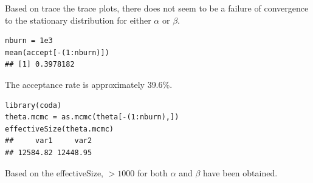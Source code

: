 \documentclass{article}\usepackage[]{graphicx}\usepackage[]{color}
\makeatletter
\newenvironment{kframe}{%
 \def\at@end@of@kframe{}%
 \ifinner\ifhmode%
  \def\at@end@of@kframe{\end{minipage}}%
  \begin{minipage}{\columnwidth}%
 \fi\fi%
 \def\FrameCommand##1{\hskip\@totalleftmargin \hskip-\fboxsep
 \colorbox{shadecolor}{##1}\hskip-\fboxsep
     \hskip-\linewidth \hskip-\@totalleftmargin \hskip\columnwidth}%
 \MakeFramed {\advance\hsize-\width
   \@totalleftmargin\z@ \linewidth\hsize
   \@setminipage}}%
 {\par\unskip\endMakeFramed%
 \at@end@of@kframe}
\newenvironment{knitrout}{}{} %
\makeatother
\begin{document}
Based on trace the trace plots, there does not seem to be a failure of convergence to the stationary distribution for either $\alpha$ or $\beta$.
\begin{knitrout}
\color{fgcolor}\begin{kframe}
\begin{verbatim}
nburn = 1e3
mean(accept[-(1:nburn)])
## [1] 0.3978182
\end{verbatim}
\end{kframe}
\end{knitrout}
The acceptance rate is approximately 39.6\%.
\begin{knitrout}
\color{fgcolor}\begin{kframe}
\begin{verbatim}
library(coda)
theta.mcmc = as.mcmc(theta[-(1:nburn),])
effectiveSize(theta.mcmc)
##     var1     var2 
## 12584.82 12448.95
\end{verbatim}
\end{kframe}
\end{knitrout}
Based on the effectiveSize, $>1000$ for both $\alpha$ and $\beta$ have been obtained.
\end{document}
